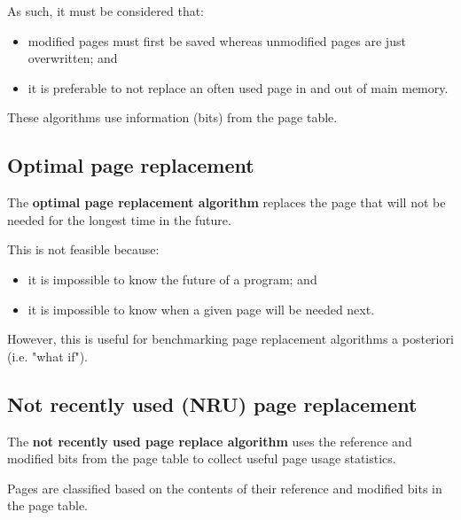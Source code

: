 \documentclass[a4paper]{systems-software}
\begin{document}
As such, it must be considered that:
\begin{itemize}
	\item modified pages must first be saved whereas unmodified pages are just overwritten; and
	\item it is preferable to not replace an often used page in and out of main memory.
\end{itemize}

These algorithms use information (bits) from the page table.


\subsection*{Optimal page replacement}

The \textbf{optimal page replacement algorithm} replaces the page that will not be needed for the longest time in the future.

This is not feasible because:
\begin{itemize}
	\item it is impossible to know the future of a program; and
	\item it is impossible to know when a given page will be needed next.
\end{itemize}

However, this is useful for benchmarking page replacement algorithms a posteriori (i.e. "what if").


\subsection*{Not recently used (NRU) page replacement}

The \textbf{not recently used page replace algorithm} uses the reference and modified bits from the page table to collect useful page usage statistics.

Pages are classified based on the contents of their reference and modified bits in the page table.
\end{document}
